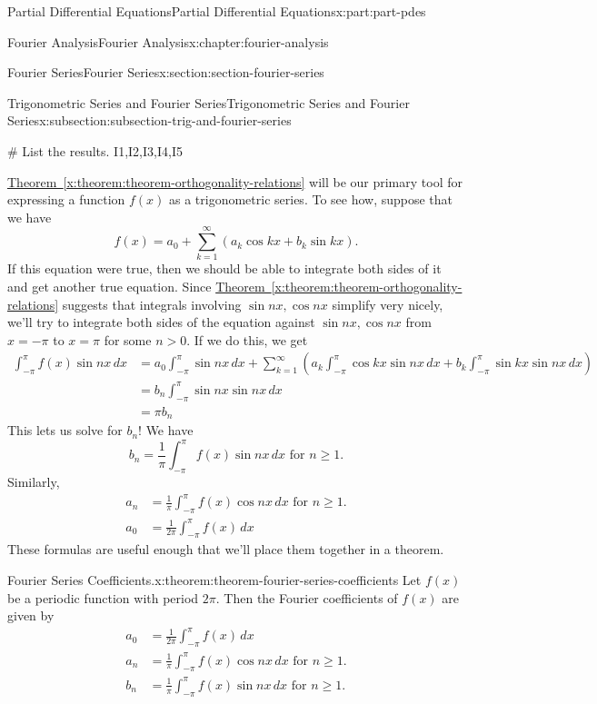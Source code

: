 \documentclass[oneside,10pt,]{book}
\newcommand{\xreffont}{\relax}
\numberwithin{equation}{part}
\newcommand{\amp}{&}
\begin{document}
\begin{partptx}{Partial Differential Equations}{}{Partial Differential Equations}{}{}{x:part:part-pdes}
\begin{chapterptx}{Fourier Analysis}{}{Fourier Analysis}{}{}{x:chapter:fourier-analysis}
\begin{sectionptx}{Fourier Series}{}{Fourier Series}{}{}{x:section:section-fourier-series}
\begin{subsectionptx}{Trigonometric Series and Fourier Series}{}{Trigonometric Series and Fourier Series}{}{}{x:subsection:subsection-trig-and-fourier-series}
\begin{sageinput}
# List the results.
I1,I2,I3,I4,I5
\end{sageinput}
\hyperref[x:theorem:theorem-orthogonality-relations]{Theorem~{\xreffont\ref{x:theorem:theorem-orthogonality-relations}}} will be our primary tool for expressing a function \(f(x)\) as a trigonometric series. To see how, suppose that we have%
\begin{equation*}
f(x) = a_{0} + \sum_{k=1}^{\infty}(a_{k}\cos kx+b_{k}\sin kx).
\end{equation*}
If this equation were true, then we should be able to integrate both sides of it and get another true equation. Since \hyperref[x:theorem:theorem-orthogonality-relations]{Theorem~{\xreffont\ref{x:theorem:theorem-orthogonality-relations}}} suggests that integrals involving \(\sin nx,\cos nx\) simplify very nicely, we'll try to integrate both sides of the equation against \(\sin nx,\cos nx\) from \(x=-\pi\) to \(x=\pi\) for some \(n>0\). If we do this, we get%
\begin{align*}
\int_{-\pi}^{\pi}f(x)\sin nx\,dx \amp = a_{0}\int_{-\pi}^{\pi}\sin nx\,dx + \sum_{k=1}^{\infty}\left(a_{k}\int_{-\pi}^{\pi}\cos kx\sin nx\,dx + b_{k}\int_{-\pi}^{\pi}\sin kx\sin nx\,dx\right)\\
\amp = b_{n}\int_{-\pi}^{\pi}\sin nx \sin nx \,dx\\
\amp = \pi b_{n}
\end{align*}
This lets us solve for \(b_{n}\)! We have%
\begin{equation*}
b_{n} = \frac{1}{\pi}\int_{-\pi}^{\pi}f(x)\sin nx\,dx\text{ for $n\geq 1$.}
\end{equation*}
Similarly,%
\begin{align*}
a_{n} \amp = \frac{1}{\pi}\int_{-\pi}^{\pi}f(x)\cos nx\,dx\text{ for $n\geq1$.}\\
a_{0} \amp = \frac{1}{2\pi}\int_{-\pi}^{\pi}f(x)\,dx
\end{align*}
These formulas are useful enough that we'll place them together in a theorem.%
\begin{theorem}{Fourier Series Coefficients.}{}{x:theorem:theorem-fourier-series-coefficients}%
%
Let \(f(x)\) be a periodic function with period \(2\pi\). Then the Fourier coefficients of \(f(x)\) are given by%
\begin{align*}
a_{0} \amp= \frac{1}{2\pi}\int_{-\pi}^{\pi}f(x)\,dx\\
a_{n} \amp = \frac{1}{\pi}\int_{-\pi}^{\pi}f(x)\cos nx\,dx\text{ for $n\geq1$.}\\
b_{n} \amp= \frac{1}{\pi}\int_{-\pi}^{\pi}f(x)\sin nx\,dx\text{ for $n\geq 1$.}

\end{align*}
\end{theorem}
\end{subsectionptx}
\end{sectionptx}
\end{chapterptx}
\end{partptx}
\end{document}
